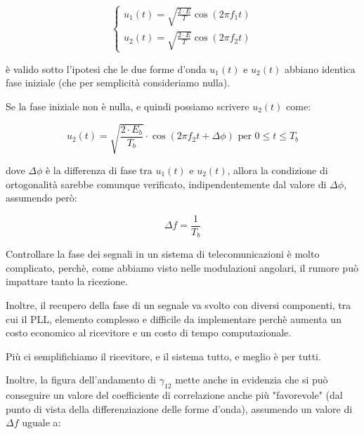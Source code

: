 {
    \Large 
    \begin{equation}
        \begin{cases}
            u_1 (t) = \sqrt{\frac{2 \cdot E}{T}} \cos(2 \pi f_1 t)
            \\
            u_2 (t) = \sqrt{\frac{2 \cdot E}{T}} \cos(2 \pi f_2 t)
        \end{cases}
    \end{equation}
}

è valido sotto l'ipotesi che le due forme d'onda $u_1 (t)$ e $u_2 (t)$ abbiano identica fase iniziale (che per semplicità consideriamo nulla). \newline 

Se la fase iniziale non è nulla, e quindi possiamo scrivere $u_2 (t)$ come: 

{
    \Large 
    \begin{equation}
        u_2 (t) = \sqrt{\frac{2 \cdot E_b}{T_b}} \cdot \cos(2 \pi f_2 t + \Delta \phi) 
        \text{ per } 0 \le t \le T_b
    \end{equation}
}

dove $\Delta \phi$ è la differenza di fase tra $u_1 (t)$ e $u_2 (t)$, 
allora la condizione di ortogonalità sarebbe comunque verificato, 
indipendentemente dal valore di $\Delta \phi$, 
assumendo però: 

{
    \Large 
    \begin{equation}
        \Delta f 
        =
        \frac{1}{T_b}
    \end{equation}
}

\begin{tcolorbox}
    Controllare la fase dei segnali in un sistema di telecomunicazioni è molto complicato, 
    perchè, come abbiamo visto nelle modulazioni angolari, il rumore può impattare tanto la ricezione. \newline 

    Inoltre, il recupero della fase di un segnale va svolto con diversi componenti, 
    tra cui il PLL, elemento complesso e difficile da implementare perchè aumenta un costo economico al ricevitore e un costo di tempo computazionale. \newline 

    Più ci semplifichiamo il ricevitore, e il sistema tutto, e meglio è per tutti.
\end{tcolorbox}

Inoltre, la figura dell'andamento di $\gamma_{12}$ mette anche in evidenzia che si può conseguire un valore del coefficiente di correlazione 
anche più "favorevole" (dal punto di vista della differenziazione delle forme d'onda), 
assumendo un valore di $\Delta f$ uguale a: 

